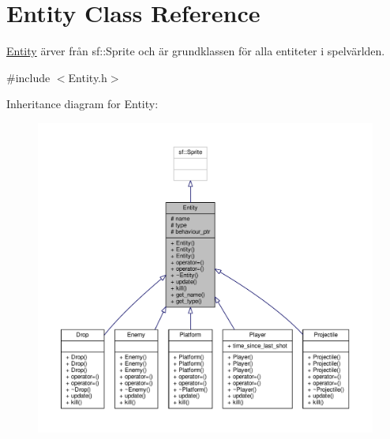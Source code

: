 \hypertarget{classEntity}{\section{Entity Class Reference}
\label{classEntity}
}


\hyperlink{classEntity}{Entity} ärver från sf\+::\+Sprite och är grundklassen för alla entiteter i spelvärlden.  




{\ttfamily \#include $<$Entity.\+h$>$}



Inheritance diagram for Entity\+:\nopagebreak
\begin{figure}[H]
\begin{center}
\leavevmode
\includegraphics[width=350pt]{classEntity__inherit__graph}
\end{center}
\end{figure}


